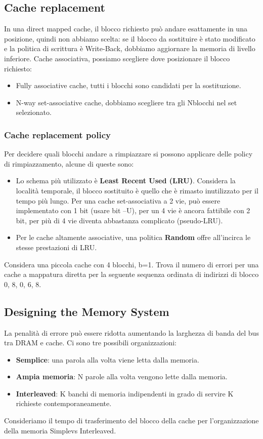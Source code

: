 \subsection{Cache replacement}
In una direct mapped cache, il blocco richiesto può andare esattamente in una posizione, quindi non abbiamo scelta: 
se il blocco da sostituire è stato modificato e la politica di scrittura è Write-Back, dobbiamo aggiornare la memoria di livello inferiore. 
Cache associativa, possiamo scegliere dove posizionare il blocco richiesto: 
\begin{itemize}
    \item Fully associative cache, tutti i blocchi sono candidati per la sostituzione.
    \item N-way set-associative cache, dobbiamo scegliere tra gli Nblocchi nel set selezionato.
\end{itemize}

\subsubsection{Cache replacement policy}
Per decidere quali blocchi andare a rimpiazzare si possono applicare delle policy di rimpiazzamento, alcune di queste sono:
\begin{itemize}
    \item Lo schema più utilizzato è \textbf{Least Recent Used (LRU)}. Considera la località temporale, il blocco sostituito è quello che è rimasto inutilizzato per il tempo più lungo. 
    Per una cache set-associativa a 2 vie, può essere implementato con 1 bit (usare bit --U), per un 4 vie è ancora fattibile con 2 bit, per più di 4 vie diventa abbastanza complicato (pseudo-LRU).
    \item Per le cache altamente associative, una politica \textbf{Random} offre all'incirca le stesse prestazioni di LRU.
\end{itemize}

\begin{example}
    Considera una piccola cache con 4 blocchi, b=1. Trova il numero di errori per una cache a mappatura diretta per la seguente sequenza ordinata di indirizzi di blocco 0, 8, 0, 6, 8.
\end{example}

\subsection{Designing the Memory System}
La penalità di errore può essere ridotta aumentando la larghezza di banda del bus tra DRAM e cache. Ci sono tre possibili organizzazioni:
\begin{itemize}
    \item \textbf{Semplice}: una parola alla volta viene letta dalla memoria.
    \item \textbf{Ampia memoria}: N parole alla volta vengono lette dalla memoria.
    \item \textbf{Interleaved}: K banchi di memoria indipendenti in grado di servire K richieste contemporaneamente.
\end{itemize}
Consideriamo il tempo di trasferimento del blocco della cache per l'organizzazione della memoria Simplevs Interleaved.

